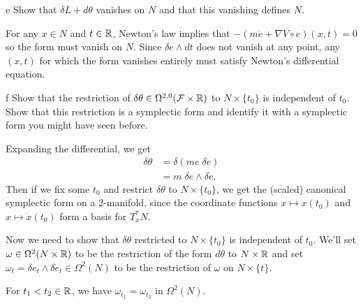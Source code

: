 \documentclass{pset}
\begin{document}
\begin{solution}
    \begin{part}{e}
        Show that $\delta L + d\theta$ vanishes on $N$ and that this vanishing defines $N$.
    \end{part}

    \quad For any $x\in N$ and $t\in \mathbb{R}$, Newton's law implies that $-(m\ddot{e} + \nabla V\circ e)(x,t)=0$ so the form must vanish on $N$. Since $\delta e\wedge dt$ does not vanish at any point, any $(x,t)$ for which the form vanishes entirely must satisfy Newton's differential equation.

    \begin{part}{f}
        Show that the restriction of $\delta \theta\in \Omega^{2, 0}(\mathcal{F}\times \mathbb{R})$ to $N\times \{t_0\}$ is independent of $t_0$. Show that this restriction is a symplectic form and identify it with a symplectic form you might have seen before.
    \end{part}
    \quad Expanding the differential, we get
    \[
        \begin{aligned}
            \delta \theta &= \delta (me\;\delta \dot{e})\\
            &= m\;\delta e\wedge \delta\dot{e}.
        \end{aligned}
    \] 
    Then if we fix some $t_0$ and restrict $\delta \theta$ to $N\times \{t_0\}$, we get the (scaled) canonical symplectic form on a 2-manifold, since the coordinate functions $x \mapsto x(t_0)$ and $x \mapsto \dot{x}(t_0)$ form a basis for $T^*_x N$. 
    
    \quad Now we need to show that $\delta \theta$ restricted to $N\times\{t_0\}$ is independent of $t_0$. We'll set $\omega\in \Omega^2(N\times \mathbb{R})$ to be the restriction of the form $d\theta$ to $N\times \mathbb{R}$ and set $\omega_t = \delta e_t\wedge \delta \dot{e}_t\in \Omega^2(N)$ to be the restriction of $\omega$ on $N\times \{t\}$. 
    
    \begin{claim}
        For $t_1<t_2\in \mathbb{R}$, we have $\omega_{t_1}=\omega_{t_2}$ in $\Omega^2(N)$.
    \end{claim}
    

\end{solution}
\end{document}
